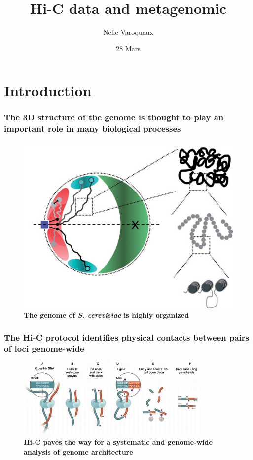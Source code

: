 \documentclass[xcolor=dvipsnames]{beamer}
\title{\textbf{Hi-C data and metagenomic}}
\author[Varoquaux Nelle]{
Nelle Varoquaux}
\date{28 Mars}
\institute{
Department of Statistics, \\
University of California, Berkeley}
\begin{document}
\begin{frame}[t, noframenumbering]
  \maketitle

\end{frame}

\setcounter{framenumber}{0}

\section{Introduction}
\begin{frame}
\frametitle{The 3D structure of the genome is thought to play an important
role in many biological processes}
\vspace{-0.6em}
\begin{figure}
\begin{center}
\includegraphics[width=0.7\linewidth]{figures/yeasts_genome_architecture.jpg}
\end{center}
\caption{\textbf{The genome of \textit{S. cerevisiae} is highly organized}
         \citep{zimmer:principles}}
\end{figure}
\end{frame}

\begin{frame}
\frametitle{The Hi-C protocol identifies physical contacts between
pairs of loci genome-wide}
\begin{figure}
\centering
\includegraphics[width=0.85\textwidth]{figures/hic_protocol.jpg}
\caption{\textbf{Hi-C paves the way for a systematic and genome-wide analysis
of genome architecture} \citep{rao:3d}}
\end{figure}
\end{frame}
\end{document}
